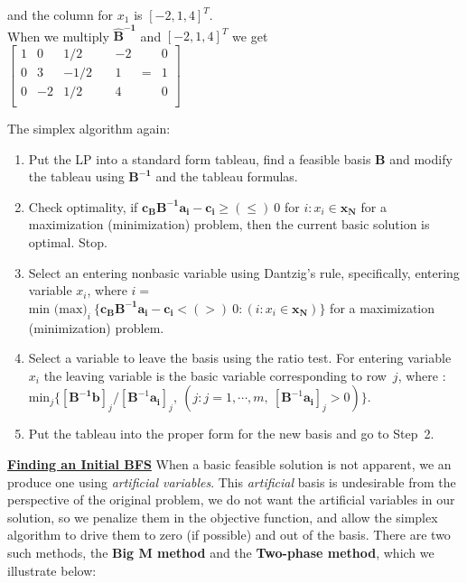 and the column for $x_1$ is $[-2, 1, 4]^T$.  \\

When we multiply $\mathbf{\hat{B}^{-1}}$ and $[-2, 1, 4]^T$ we get \\

$\left[\begin{array}{ccccccc}
    1 & 0  & 1/2    &~& -2  & & 0 \\
    0 & 3  & -1/2   &~& 1   &=& 1 \\
    0 & -2 &  1/2   &~& 4   & & 0 \\
\end{array} \right]$


\vspace{10mm}The simplex algorithm again:
\begin{enumerate}
\item Put the LP into a standard form tableau, find a feasible basis $\mathbf{B}$ and  modify the tableau using  $\mathbf{B^{-1}}$ and the tableau formulas.
\item Check optimality, if $\mathbf{c_BB^{-1}a_i -c_i} \ge (\le)~0$ for $i: x_i \in \mathbf{x_N}$ for a maximization (minimization) problem, then the current basic solution is optimal. Stop.
\item Select an entering nonbasic variable using Dantzig's rule, specifically, entering variable $x_i$, where $i =$ \\
$ \text{min (max)}_i~\{ \mathbf{c_BB^{-1}a_i -c_i} < (>)~ 0: (i: x_i \in \mathbf{x_N})\}$ for a maximization (minimization) problem.
\item Select a variable to leave the basis using the ratio test. For entering variable $x_i$ the leaving variable is the basic variable corresponding to row~$j$, where :\\
$\text{min}_j \{[\mathbf{B^{-1}b}]_j/[\mathbf{B}^{-1}\mathbf{a_i}]_j,~( j:j = 1, \cdots,m,~[\mathbf{B}^{-1}\mathbf{a_i}]_j > 0)\}$.
\item Put the  tableau into the proper form for the new basis and go to Step~2.
\end{enumerate}



\underline{\bf Finding an Initial BFS}
When a basic feasible solution is not apparent, we an produce one using {\it artificial variables}.  This {\it artificial} basis is undesirable from the perspective of the original problem, we do not want the artificial variables in our solution, so we penalize them in the objective function, and allow the simplex algorithm to drive them to zero (if possible) and out of the basis.  There are two such methods, the {\bf Big M method} and the {\bf Two-phase method}, which we illustrate below:

